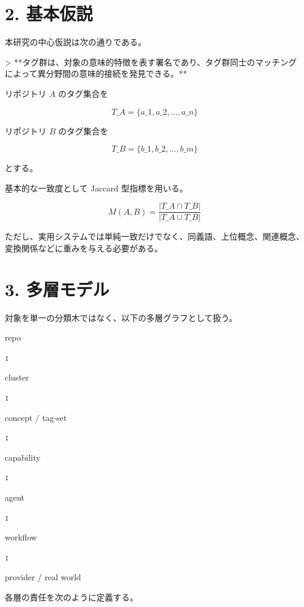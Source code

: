 \documentclass[a4paper,11pt]{jsarticle}
\begin{document}
\section{2. 基本仮説}
本研究の中心仮説は次の通りである。


> **タグ群は、対象の意味的特徴を表す署名であり、タグ群同士のマッチングによって異分野間の意味的接続を発見できる。**


リポジトリ \(A\) のタグ集合を


\[


T\_A=\{a\_1,a\_2,\ldots,a\_n\}


\]


リポジトリ \(B\) のタグ集合を


\[


T\_B=\{b\_1,b\_2,\ldots,b\_m\}


\]


とする。


基本的な一致度として Jaccard 型指標を用いる。


\[


M(A,B)=\frac{|T\_A\cap T\_B|}{|T\_A\cup T\_B|}


\]


ただし、実用システムでは単純一致だけでなく、同義語、上位概念、関連概念、変換関係などに重みを与える必要がある。


\section{3. 多層モデル}
対象を単一の分類木ではなく、以下の多層グラフとして扱う。


repo


  ↕


cluster


  ↕


concept / tag-set


  ↕


capability


  ↕


agent


  ↕


workflow


  ↕


provider / real world


各層の責任を次のように定義する。
\end{document}
